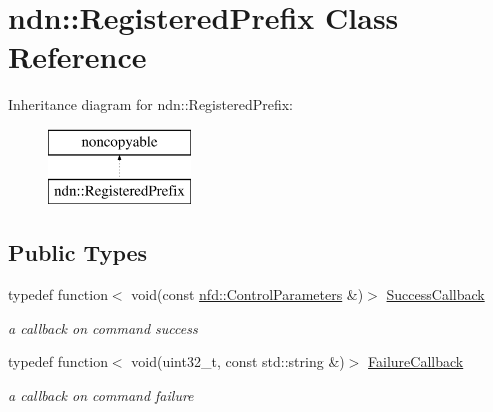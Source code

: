 \hypertarget{classndn_1_1RegisteredPrefix}{}\section{ndn\+:\+:Registered\+Prefix Class Reference}
\label{classndn_1_1RegisteredPrefix}
Inheritance diagram for ndn\+:\+:Registered\+Prefix\+:\begin{figure}[H]
\begin{center}
\leavevmode
\includegraphics[height=2.000000cm]{classndn_1_1RegisteredPrefix}
\end{center}
\end{figure}
\subsection*{Public Types}
\begin{DoxyCompactItemize}
\item 
typedef function$<$ void(const \hyperlink{classndn_1_1nfd_1_1ControlParameters}{nfd\+::\+Control\+Parameters} \&)$>$ \hyperlink{classndn_1_1RegisteredPrefix_ab5e240a5aa5e1aa340c47f71fa64d1e4}{Success\+Callback}\hypertarget{classndn_1_1RegisteredPrefix_ab5e240a5aa5e1aa340c47f71fa64d1e4}{}\label{classndn_1_1RegisteredPrefix_ab5e240a5aa5e1aa340c47f71fa64d1e4}

\begin{DoxyCompactList}\small\item\em a callback on command success \end{DoxyCompactList}\item 
typedef function$<$ void(uint32\+\_\+t, const std\+::string \&)$>$ \hyperlink{classndn_1_1RegisteredPrefix_adb1f7412ef8e60d75482d8fd68f03263}{Failure\+Callback}\hypertarget{classndn_1_1RegisteredPrefix_adb1f7412ef8e60d75482d8fd68f03263}{}\label{classndn_1_1RegisteredPrefix_adb1f7412ef8e60d75482d8fd68f03263}

\begin{DoxyCompactList}\small\item\em a callback on command failure \end{DoxyCompactList}\end{DoxyCompactItemize}
